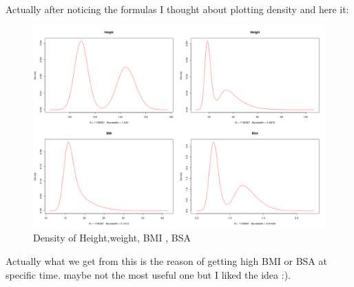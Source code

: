 \documentclass{article}
\begin{document}
Actually after noticing the formulas I thought about plotting density and here it: 
\begin{figure}[H]
\begin{center}
\includegraphics[scale=0.4]{density.png}
\end{center}
\caption{Density of Height,weight, BMI , BSA}
\end{figure}
Actually what we get from this is the reason of getting high BMI or BSA at specific time. maybe not the most useful one but I liked the idea :).
\end{document}
